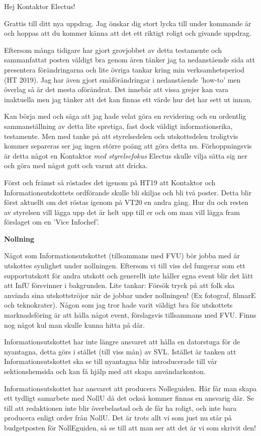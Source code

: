 \documentclass[10pt]{article}
\begin{document}
\heading{\doctitle}

Hej Kontaktor Electus! 


Grattis till ditt nya uppdrag. Jag önskar dig stort lycka till under kommande år och hoppas att du kommer känna att det ett riktigt roligt och givande uppdrag.

Eftersom många tidigare har gjort grovjobbet av detta testamente och sammanfattat posten väldigt bra genom åren tänker jag ta nedanstående sida att presentera förändringarna och lite övriga tankar kring min verksamhetsperiod (HT 2019). Jag har även gjort småförändringar i nedanstående 'how-to' men överlag så är det mesta oförändrat. Det innebär att vissa grejer kan vara inaktuella men jag tänker att det kan finnas ett värde hur det har sett ut innan. 

Kan börja med och säga att jag hade velat göra en revidering och en ordentlig sammanställning av detta lite spretiga, fast dock väldigt informationsrika, testamente. Men med tanke på att styrelsedelen och utskottsdelen troligtvis kommer separeras ser jag ingen större poäng att göra detta nu. Förhoppningsvis är detta något en Kontaktor \textit{med styrelsefokus} Electus skulle vilja sätta sig ner och göra med något gott och varmt att dricka.

Först och främst så röstades det igenom på HT19 att Kontaktor och Informationsutskottets ordförande skulle bli skiljas och bli två poster. Detta blir först aktuellt om det röstas igenom på VT20 en andra gång. Hur du och resten av styrelsen vill lägga upp det är helt upp till er och om man vill lägga fram förslaget om en 'Vice Infochef'.  

{\large \textbf{Nollning}}

\begin{dashlist}
    \item Något som Informationsutskottet (tillsammans med FVU) bör jobba med är utskottes synlighet under nollningen. Eftersom vi till viss del fungerar som ett supportutskott för andra utskott och generellt inte håller egna event blir det lätt att InfU försvinner i bakgrunden. 
     Lite tankar: Försök tryck på att folk ska använda sina utskottströjor när de jobbar under nollningen! (Ex fotograf, filmarE och teknokrater). 
     Någon som jag tror hade varit väldigt bra för utskottets marknadsföring är att hålla något event, förslagsvis tillsammans med FVU. Finns nog något kul man skulle kunna hitta på där.
    \item Informationsutskottet har inte längre ansvaret att hålla en datorstuga för de nyantagna, detta görs i stället (till viss mån) av SVL. Istället är tanken att Informationsutskottet ska se till nyantagna blir introducerade till vår sektionshemsida och kan få hjälp med att skapa användarkonton.  
    \item Informationsutskottet har ansvaret att producera Nolleguiden. Här får man skapa ett tydligt samarbete med NollU då det också kommer finnas en ansvarig där. Se till att redaktionen inte blir överbelastad och de får ha roligt, och inte bara producera enligt order från NollU. Det är trots allt vi som just nu står på budgetposten för NollEguiden, så se till att man ser att det är vi som skrivit den!
\end{dashlist}
\end{document}
